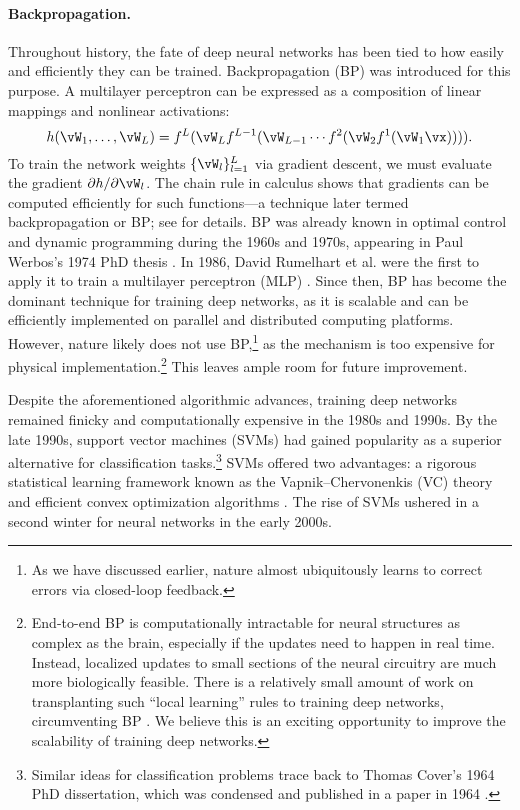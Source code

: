 \documentclass[../../book-main.tex]{subfiles}
\begin{document}
\paragraph{Backpropagation.}
Throughout history, the fate of deep neural networks has been tied to how easily and efficiently they can be trained. Backpropagation (BP) was introduced for this purpose. A multilayer perceptron can be expressed as a composition of linear mappings and nonlinear activations:
\begin{equation}
    h(\vW_{1}, \ldots, \vW_{L}) = f^{L}(\vW_{L}f^{L-1}(\vW_{L-1} \cdots f^{2}(\vW_{2}f^{1}(\vW_{1}\vx)))).
\end{equation}
To train the network weights \(\{\vW_{l}\}_{l=1}^{L}\) via gradient descent, we must evaluate the gradient \(\partial h/\partial \vW_{l}\). The chain rule in calculus shows that gradients can be computed efficiently for such functions---a technique later termed backpropagation or BP; see  for details. BP was already known in optimal control and dynamic programming during the 1960s and 1970s, appearing in Paul Werbos's 1974 PhD thesis \cite{Werbos-1974, Werbos1994TheRO}. In 1986, David Rumelhart et al. were the first to apply it to train a multilayer perceptron (MLP) \cite{Rumelhart1986}. Since then, BP has become the dominant technique for training deep networks, as it is scalable and can be efficiently implemented on parallel and distributed computing platforms. However, nature likely does not use BP,\footnote{As we have discussed earlier, nature almost ubiquitously learns to correct errors via closed-loop feedback.} as the mechanism is too expensive for physical implementation.\footnote{End-to-end BP is computationally intractable for neural structures as complex as the brain, especially if the updates need to happen in real time. Instead, localized updates to small sections of the neural circuitry are much more biologically feasible. There is a relatively small amount of work on transplanting such ``local learning'' rules to training deep networks, circumventing BP \cite{baldi2016theory,li2025noprop}. We believe this is an exciting opportunity to improve the scalability of training deep networks.} This leaves ample room for future improvement.

Despite the aforementioned algorithmic advances, training deep networks remained finicky and computationally expensive in the 1980s and 1990s. By the late 1990s, support vector machines (SVMs) \cite{SVM-1995} had gained popularity as a superior alternative for classification tasks.\footnote{Similar ideas for classification problems trace back to Thomas Cover's 1964 PhD dissertation, which was condensed and published in a paper in 1964 \cite{Cover-1964}.} SVMs offered two advantages: a rigorous statistical learning framework known as the Vapnik--Chervonenkis (VC) theory and efficient convex optimization algorithms \cite{BoydVa04}. The rise of SVMs ushered in a second winter for neural networks in the early 2000s.
\end{document}
